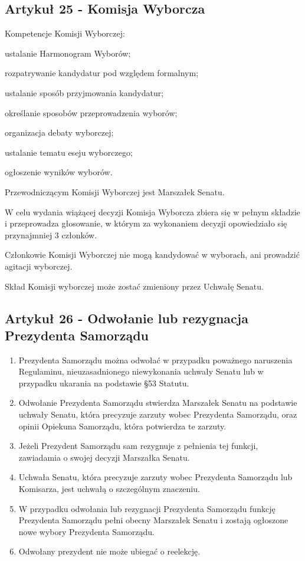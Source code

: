 \documentclass[14pt]{article}
\newcounter{podpunktyCounter}
\newenvironment{podpunkty}
{%
	\begin{list}{\arabic{podpunktyCounter})}%
		{%
			\usecounter{podpunktyCounter}
			\setlength{\itemsep}{1pt}
			\setlength{\topsep}{3pt}
		}%
	}%
	{\end{list}}
\newenvironment{ustepy}{%
	\begin{enumerate}[leftmargin=1.5em, itemindent=1pt, labelwidth=1em, itemsep=5pt]
	}{%
	\end{enumerate}
}
\begin{document}
\subsection*{Artykuł 25 - Komisja Wyborcza}
\begin{ustepy}
	\item Kompetencje Komisji Wyborczej:
	\begin{podpunkty}
		\item ustalanie Harmonogram Wyborów;
		\item rozpatrywanie kandydatur pod względem formalnym;
		\item ustalanie sposób przyjmowania kandydatur;
		\item określanie sposobów przeprowadzenia wyborów;
		\item organizacja debaty wyborczej;
		\item ustalanie tematu eseju wyborczego;
		\item ogłoszenie wyników wyborów.
	\end{podpunkty}
	\item Przewodniczącym Komisji Wyborczej jest Marszałek Senatu.
	\item W celu wydania wiążącej decyzji Komisja Wyborcza zbiera się w pełnym składzie i przeprowadza głosowanie, w którym za wykonaniem decyzji opowiedziało się przynajmniej 3 członków.
	\item Członkowie Komisji Wyborczej nie mogą kandydować w wyborach, ani prowadzić agitacji wyborczej.
	\item Skład Komisji wyborczej może zostać zmieniony przez Uchwałę Senatu.
	\end{ustepy}
\subsection*{Artykuł 26 - Odwołanie lub rezygnacja Prezydenta Samorządu}
\begin{ustepy}
	\item Prezydenta Samorządu można odwołać w przypadku poważnego naruszenia Regulaminu, nieuzasadnionego niewykonania uchwały Senatu lub w przypadku ukarania na podstawie §53 Statutu.
	\item Odwołanie Prezydenta Samorządu stwierdza Marszałek Senatu na podstawie uchwały Senatu, która precyzuje zarzuty wobec Prezydenta Samorządu, oraz opinii Opiekuna Samorządu, która potwierdza te zarzuty.
	\item Jeżeli Prezydent Samorządu sam rezygnuje z pełnienia tej funkcji, zawiadamia o swojej decyzji Marszałka Senatu.
	\item Uchwała Senatu, która precyzuje zarzuty wobec Prezydenta Samorządu lub Komisarza, jest uchwałą o szczególnym znaczeniu.
	\item W przypadku odwołania lub rezygnacji Prezydenta Samorządu funkcję Prezydenta Samorządu pełni obecny Marszałek Senatu i zostają ogłoszone nowe wybory Prezydenta Samorządu.
	\item Odwołany prezydent nie może ubiegać o reelekcję.
\end{ustepy}
\end{document}
